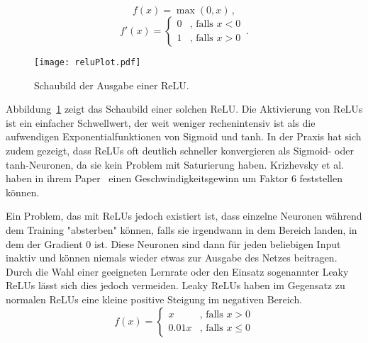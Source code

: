 	
\begin{equation}
	f(x) = \max(0, x) \, ,
\end{equation}
\begin{equation*}
	f'(x) = \begin{cases}
	0 &\text{, falls $x < 0$}\\
	1 &\text{, falls $x > 0$}
	\end{cases} \, .
\end{equation*}

\begin{figure}[h]
	\centering
	\texttt{[image: reluPlot.pdf]}
	\caption{Schaubild der Ausgabe einer ReLU.}
	\label{reluoutput}
\end{figure}
Abbildung~\ref{reluoutput} zeigt das Schaubild einer solchen ReLU. 
Die Aktivierung von ReLUs ist ein einfacher Schwellwert, der weit weniger rechenintensiv ist als die aufwendigen Exponentialfunktionen von Sigmoid und tanh.
In der Praxis hat sich zudem gezeigt, dass ReLUs oft deutlich schneller konvergieren als Sigmoid- oder tanh-Neuronen, da sie kein Problem mit Saturierung haben.
Krizhevsky et al. haben in ihrem Paper~\cite{NIPS2012_4824} einen Geschwindigkeitsgewinn um Faktor 6 feststellen können.

Ein Problem, das mit ReLUs jedoch existiert ist, dass einzelne Neuronen während dem Training "absterben" können, falls sie irgendwann in dem Bereich landen, in dem der Gradient 0 ist.
Diese Neuronen sind dann für jeden beliebigen Input inaktiv und können niemals wieder etwas zur Ausgabe des Netzes beitragen.
Durch die Wahl einer geeigneten Lernrate oder den Einsatz sogenannter Leaky ReLUs lässt sich dies jedoch vermeiden.
Leaky ReLUs haben im Gegensatz zu normalen ReLUs eine kleine positive Steigung im negativen Bereich.
\begin{equation}
	f(x) = \begin{cases}
		x &\text{, falls } x  >  0\\
		0.01 x &\text{, falls } x  \leq  0
	\end{cases}
\end{equation} 






